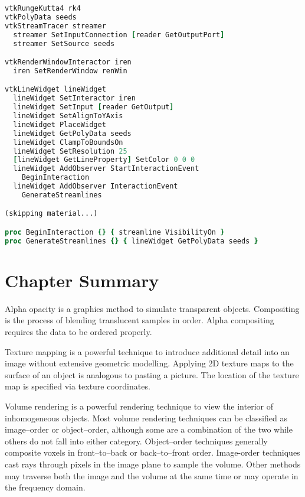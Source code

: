 \clearpage
{}
\begin{lstlisting}[language=TCL, caption={An example of using vtkLineWidget to produce sreamlines.}]
vtkRungeKutta4 rk4
vtkPolyData seeds
vtkStreamTracer streamer
  streamer SetInputConnection [reader GetOutputPort]
  streamer SetSource seeds

vtkRenderWindowInteractor iren
  iren SetRenderWindow renWin

vtkLineWidget lineWidget
  lineWidget SetInteractor iren
  lineWidget SetInput [reader GetOutput]
  lineWidget SetAlignToYAxis
  lineWidget PlaceWidget
  lineWidget GetPolyData seeds
  lineWidget ClampToBoundsOn
  lineWidget SetResolution 25
  [lineWidget GetLineProperty] SetColor 0 0 0
  lineWidget AddObserver StartInteractionEvent
    BeginInteraction
  lineWidget AddObserver InteractionEvent
    GenerateStreamlines

(skipping material...)

proc BeginInteraction {} { streamline VisibilityOn }
proc GenerateStreamlines {} { lineWidget GetPolyData seeds }
\end{lstlisting}


\section{Chapter Summary}

Alpha opacity is a graphics method to simulate transparent objects. Compositing is the process of blending translucent samples in order. Alpha compositing requires the data to be ordered properly.

Texture mapping is a powerful technique to introduce additional detail into an image without extensive geometric modelling. Applying 2D texture maps to the surface of an object is analogous to pasting a picture. The location of the texture map is specified via texture coordinates.

Volume rendering is a powerful rendering technique to view the interior of inhomogeneous objects. Most volume rendering techniques can be classified as image--order or object--order, although some are a combination of the two while others do not fall into either category. Object--order techniques generally composite voxels in front--to--back or back--to--front order. Image-order techniques cast rays through pixels in the image plane to sample the volume. Other methods may traverse both the image and the volume at the same time or may operate in the frequency domain.

